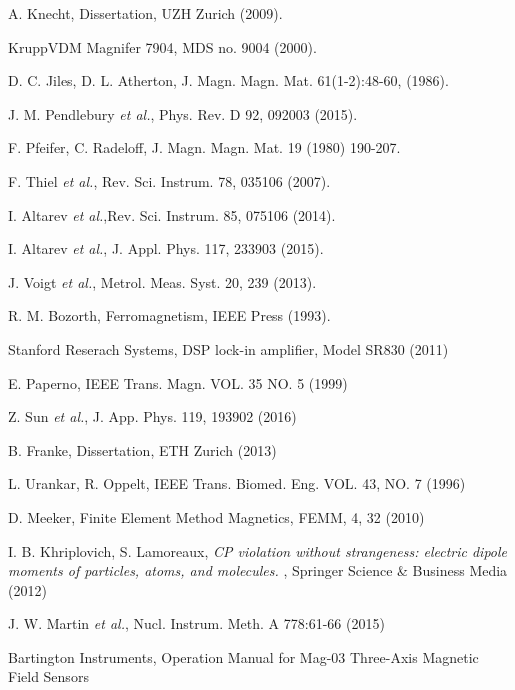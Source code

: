 \documentclass[review]{elsarticle}
\begin{document}
\begin{thebibliography}{00}
 A. Knecht, Dissertation, UZH Zurich (2009).

 KruppVDM Magnifer 7904, MDS no. 9004 (2000).

 D. C. Jiles, D. L. Atherton,  J. Magn. Magn. Mat. 61(1-2):48-60, (1986).

 J. M. Pendlebury {\it et al.}, Phys. Rev. D 92, 092003 (2015).

 F. Pfeifer, C. Radeloff, J. Magn. Magn. Mat. 19 (1980) 190-207.

 F. Thiel {\it et al.}, Rev. Sci. Instrum. 78, 035106 (2007).

 I. Altarev {\it et al.},Rev. Sci. Instrum. 85, 075106 (2014).

 I. Altarev {\it et al.}, J. Appl. Phys. 117, 233903 (2015).

 J. Voigt {\it et al.}, Metrol. Meas. Syst. 20, 239 (2013).

 R. M. Bozorth, Ferromagnetism, IEEE Press (1993).

 Stanford Reserach Systems, DSP lock-in amplifier, Model SR830 (2011)

 E. Paperno, IEEE Trans. Magn. VOL. 35 NO. 5 (1999)

 Z. Sun {\it et al.}, J. App. Phys. 119, 193902 (2016)

 B. Franke, Dissertation, ETH Zurich (2013)

 L. Urankar, R. Oppelt, IEEE Trans. Biomed. Eng. VOL. 43, NO. 7 (1996) 

 D. Meeker, Finite Element Method Magnetics, FEMM, 4, 32 (2010)

 I. B. Khriplovich,
  S. Lamoreaux, { \it CP violation without strangeness: electric
    dipole moments of particles, atoms, and molecules. }, Springer
  Science \& Business Media (2012)

 J. W. Martin {\it et al.}, Nucl. Instrum. Meth. A 778:61-66 (2015) 

 Bartington Instruments, Operation Manual for Mag-03 Three-Axis Magnetic Field Sensors 
\end{thebibliography}
\end{document}

